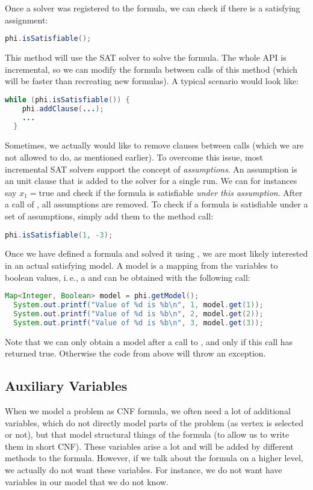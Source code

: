 \documentclass[a4paper, ukenglish, twoside, openright]{jdrasilmanual}
\begin{document}
Once a solver was registered to the formula, we can check if there is
a satisfying assignment:
\begin{lstlisting}[language=Java]
  phi.isSatisfiable();
\end{lstlisting}
This method will use the SAT solver to solve the formula. The whole
API is incremental, so we can modify the formula between calls of
this method (which will be faster than recreating new formulas). A
typical scenario would look like:
\begin{lstlisting}[language=Java]
  while (phi.isSatisfiable()) {
    phi.addClause(...);
    ...
  }
\end{lstlisting}
Sometimes, we actually would like to remove clauses between calls
(which we are not allowed to do, as mentioned earlier). To overcome
this issue, most incremental SAT solvers support the concept of
\emph{assumptions}. An assumption is an unit clause that is added to
the solver for a single run. We can for instances say
$x_1=\mathrm{true}$ and check if the formula is satisfiable
\emph{under this assumption}. After a
call of , all assumptions are removed.
To check if a formula is satisfiable under a set of assumptions,
simply add them to the method call:
\begin{lstlisting}[language=Java]
  phi.isSatisfiable(1, -3);
\end{lstlisting}
Once we have defined a formula and solved it using
, we are most likely interested in an actual
satisfying model. A model is a mapping from the variables to boolean
values, i.\,e., a  and can be obtained
with the following call:
\begin{lstlisting}[language=Java]
  Map<Integer, Boolean> model = phi.getModel();
  System.out.printf("Value of %d is %b\n", 1, model.get(1));
  System.out.printf("Value of %d is %b\n", 2, model.get(2));
  System.out.printf("Value of %d is %b\n", 3, model.get(3));
\end{lstlisting}
Note that we can only obtain a model after a call to
, and only if this call has returned
true. Otherwise the code from above will throw an exception.

\subsection{Auxiliary Variables}
When we model a problem as CNF formula, we often need a lot of
additional variables, which do not directly model parts of the problem
(as vertex is selected or not), but that model structural things of
the formula (to allow us to write them in short CNF). These variables
arise a lot and will be added by different methods to the
formula. However, if we talk about the formula on a higher level, we
actually do not want these variables. For instance, we do not want
have variables in our model that we do not know.
\end{document}
